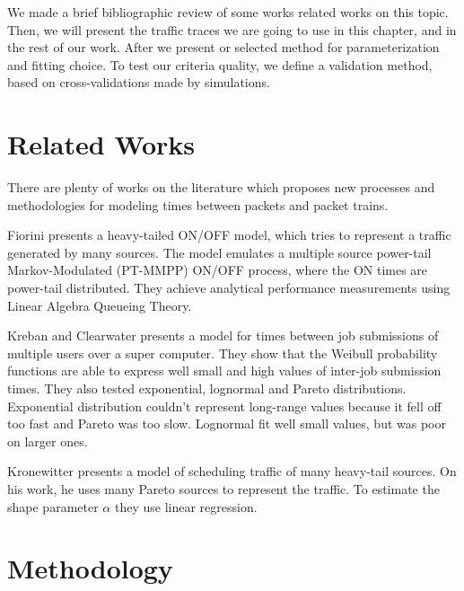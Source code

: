 We made a brief bibliographic review of some works related works on this topic. Then, we will present the traffic traces we are going to use in this chapter, and in the rest of our work. After we present or selected method for parameterization and fitting choice. To test our criteria quality, we define a validation method, based on cross-validations made by simulations.

\section{Related Works}

There are plenty of works on the literature which proposes new processes and methodologies for modeling times between packets and packet trains.

Fiorini \cite{modeling-concurrent-heavy-tailed} presents a heavy-tailed ON/OFF model, which tries to represent a traffic generated by many sources. The model emulates a multiple source power-tail Markov-Modulated (PT-MMPP) ON/OFF process, where the ON times are power-tail distributed. They achieve analytical performance measurements using Linear Algebra Queueing Theory.

Kreban and Clearwater\cite{hierarchical-dynamics-interarrival-times} presents a model for times between job submissions of multiple users over a super computer. They show that the Weibull probability functions are able to express well small and high values of inter-job submission times. They also tested exponential, lognormal and Pareto distributions. Exponential distribution couldn't  represent long-range values because it fell off too fast and Pareto was too slow. Lognormal fit well small values, but was poor on larger ones.    

Kronewitter\cite{optimal-scheduling-of-heavy-tailed-traffic} presents a model of scheduling traffic of many heavy-tail sources. On his work, he uses many Pareto sources to represent the traffic. To estimate the shape parameter $\alpha$ they use linear regression.





\section{Methodology}

